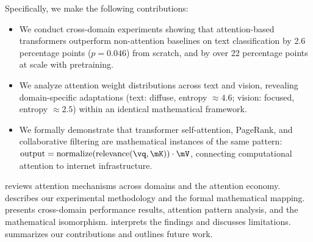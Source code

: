 Specifically, we make the following contributions:
\begin{itemize}[leftmargin=*,itemsep=0pt,topsep=0pt]
    \item We conduct cross-domain experiments showing that attention-based transformers outperform non-attention baselines on text classification by 2.6 percentage points ($p{=}0.046$) from scratch, and by over 22 percentage points at scale with pretraining.
    \item We analyze attention weight distributions across text and vision, revealing domain-specific adaptations (text: diffuse, entropy ${\approx}4.6$; vision: focused, entropy ${\approx}2.5$) within an identical mathematical framework.
    \item We formally demonstrate that transformer self-attention, PageRank, and collaborative filtering are mathematical instances of the same pattern: $\text{output} = \text{normalize}(\text{relevance}(\vq, \mK)) \cdot \mV$, connecting computational attention to internet infrastructure.
\end{itemize}

 reviews attention mechanisms across domains and the attention economy.  describes our experimental methodology and the formal mathematical mapping.  presents cross-domain performance results, attention pattern analysis, and the mathematical isomorphism.  interprets the findings and discusses limitations.  summarizes our contributions and outlines future work.
